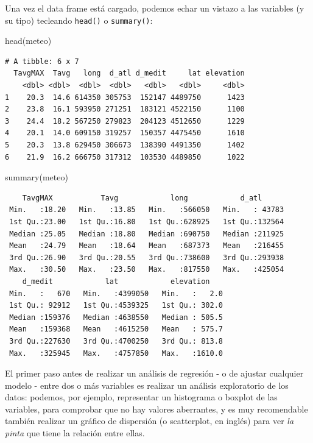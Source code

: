 \documentclass[
  letterpaper,
  DIV=11,
  numbers=noendperiod]{scrreprt}
\newenvironment{Shaded}{\begin{snugshade}}{\end{snugshade}}
\newcommand{\FunctionTok}[1]{\textcolor[rgb]{0.28,0.35,0.67}{#1}}
\newcommand{\NormalTok}[1]{\textcolor[rgb]{0.00,0.23,0.31}{#1}}
\begin{document}
Una vez el data frame está cargado, podemos echar un vistazo a las
variables (y su tipo) tecleando \texttt{head()} o \texttt{summary()}:

\begin{Shaded}
\begin{Highlighting}[]
\FunctionTok{head}\NormalTok{(meteo)}
\end{Highlighting}
\end{Shaded}

\begin{verbatim}
# A tibble: 6 x 7
  TavgMAX  Tavg   long  d_atl d_medit     lat elevation
    <dbl> <dbl>  <dbl>  <dbl>   <dbl>   <dbl>     <dbl>
1    20.3  14.6 614350 305753  152147 4489750      1423
2    23.8  16.1 593950 271251  183121 4522150      1100
3    24.4  18.2 567250 279823  204123 4512650      1229
4    20.1  14.0 609150 319257  150357 4475450      1610
5    20.3  13.8 629450 306673  138390 4491350      1402
6    21.9  16.2 666750 317312  103530 4489850      1022
\end{verbatim}

\begin{Shaded}
\begin{Highlighting}[]
\FunctionTok{summary}\NormalTok{(meteo)}
\end{Highlighting}
\end{Shaded}

\begin{verbatim}
    TavgMAX           Tavg            long            d_atl       
 Min.   :18.20   Min.   :13.85   Min.   :566050   Min.   : 43783  
 1st Qu.:23.00   1st Qu.:16.80   1st Qu.:628925   1st Qu.:132564  
 Median :25.05   Median :18.80   Median :690750   Median :211925  
 Mean   :24.79   Mean   :18.64   Mean   :687373   Mean   :216455  
 3rd Qu.:26.90   3rd Qu.:20.55   3rd Qu.:738600   3rd Qu.:293938  
 Max.   :30.50   Max.   :23.50   Max.   :817550   Max.   :425054  
    d_medit            lat            elevation     
 Min.   :   670   Min.   :4399050   Min.   :   2.0  
 1st Qu.: 92912   1st Qu.:4539325   1st Qu.: 302.0  
 Median :159376   Median :4638550   Median : 505.5  
 Mean   :159368   Mean   :4615250   Mean   : 575.7  
 3rd Qu.:227630   3rd Qu.:4700250   3rd Qu.: 813.8  
 Max.   :325945   Max.   :4757850   Max.   :1610.0  
\end{verbatim}

El primer paso antes de realizar un análisis de regresión - o de ajustar
cualquier modelo - entre dos o más variables es realizar un análisis
exploratorio de los datos: podemos, por ejemplo, representar un
histograma o boxplot de las variables, para comprobar que no hay valores
aberrantes, y es muy recomendable también realizar un gráfico de
dispersión (o scatterplot, en inglés) para ver \emph{la pinta} que tiene
la relación entre ellas.
\end{document}
